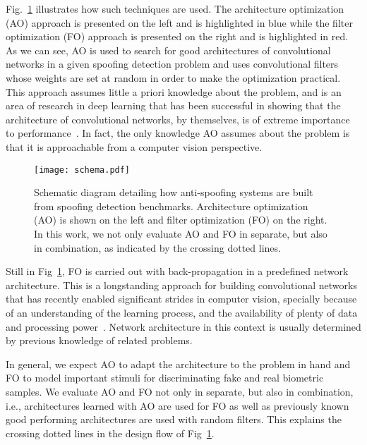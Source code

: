 
Fig.~\ref{f.schema} illustrates how such techniques are used. The architecture optimization (AO) approach is presented on the left and is highlighted in blue while the filter optimization (FO) approach is presented on the right and is highlighted in red. As we can see, AO is used to search for good architectures of convolutional networks in a given spoofing detection problem and uses convolutional filters whose weights are set at random in order to make the optimization practical. This approach assumes little a priori knowledge about the problem, and is an area of research in deep learning that has been successful in showing that the architecture of convolutional networks, by themselves, is of extreme importance to performance~\cite{Pinto:2009,Bergstra:2012,Saxe:2011,Pinto:2011b,Bergstra:2011,Bergstra:2013}. In fact, the only knowledge AO assumes about the problem is that it is approachable from a computer vision perspective.



\begin{figure}
\begin{center}
\texttt{[image: schema.pdf]} %
\end{center}
\caption{Schematic diagram detailing how anti-spoofing systems are
  built from spoofing detection benchmarks. Architecture optimization
  (AO) is shown on the left and filter optimization (FO) on the
  right. In this work, we not only evaluate AO and FO in separate, but
  also in combination, as indicated by the crossing dotted lines.}
\label{f.schema}
\end{figure}

Still in Fig~\ref{f.schema}, FO is carried out with back-propagation in a predefined network architecture. This is a longstanding approach for building convolutional networks that has recently enabled significant strides in computer vision, specially because of an understanding of the learning process, and the availability of plenty of data and processing power~\cite{Krizhevsky:2012,Taigman:2014,Simonyan:2014}. Network architecture in this context is usually determined by previous knowledge of related problems.


In general, we expect AO to adapt the architecture to the problem in hand and FO to model important stimuli for discriminating fake and real biometric samples. 
We evaluate AO and FO not only in separate, but also in combination, i.e., architectures learned with AO are used for FO as well as previously known good performing architectures are used with random filters.
This explains the crossing dotted lines in the design flow of Fig~\ref{f.schema}.

